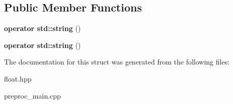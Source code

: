 \subsection*{Public Member Functions}
\begin{DoxyCompactItemize}
\item 
\hypertarget{structtml_1_1impl_1_1to__string_3_01tml_1_1floating_1_1number_3_01S_00_01E_00_01M_01_4_01_4_a1265d354f263d9efdc580ed435b5f89b}{{\bfseries operator std\+::string} ()}\label{structtml_1_1impl_1_1to__string_3_01tml_1_1floating_1_1number_3_01S_00_01E_00_01M_01_4_01_4_a1265d354f263d9efdc580ed435b5f89b}

\item 
\hypertarget{structtml_1_1impl_1_1to__string_3_01tml_1_1floating_1_1number_3_01S_00_01E_00_01M_01_4_01_4_a1265d354f263d9efdc580ed435b5f89b}{{\bfseries operator std\+::string} ()}\label{structtml_1_1impl_1_1to__string_3_01tml_1_1floating_1_1number_3_01S_00_01E_00_01M_01_4_01_4_a1265d354f263d9efdc580ed435b5f89b}

\end{DoxyCompactItemize}


The documentation for this struct was generated from the following files\+:\begin{DoxyCompactItemize}
\item 
float.\+hpp\item 
preproc\+\_\+main.\+cpp\end{DoxyCompactItemize}
